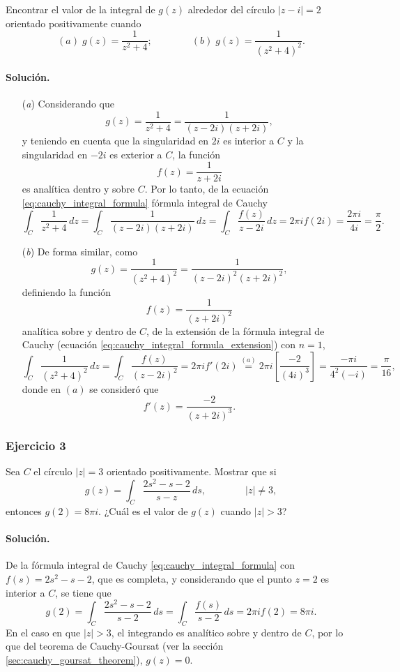 \documentclass[a4paper]{report}
\begin{document}
Encontrar el valor de la integral de \(g(z)\) alrededor del círculo \(|z-i|=2\) orientado positivamente cuando 
\[
 (\textit{a})\;g(z)=\frac{1}{z^2+4};\qquad\qquad 
 (\textit{b})\;g(z)=\frac{1}{(z^2+4)^2}.
\]

\paragraph{Solución.}
\begin{enumerate}
 \item[(\textit{a})] Considerando que 
 \[
  g(z)=\frac{1}{z^2+4}=\frac{1}{(z-2i)(z+2i)},
 \]
 y teniendo en cuenta que la singularidad en \(2i\) es interior a \(C\) y la singularidad en \(-2i\) es exterior a \(C\), la función 
 \[
  f(z)=\frac{1}{z+2i}
 \]
 es analítica dentro y sobre \(C\). Por lo tanto, de la ecuación \ref{eq:cauchy_integral_formula} fórmula integral de Cauchy
 \[
  \int_C\frac{1}{z^2+4}\,dz=\int_C\frac{1}{(z-2i)(z+2i)}\,dz=\int_C\frac{f(z)}{z-2i}\,dz=2\pi if(2i)=\frac{2\pi i}{4i}=\frac{\pi}{2}.
 \]
 \item[(\textit{b})] De forma similar, como
 \[
  g(z)=\frac{1}{(z^2+4)^2}=\frac{1}{(z-2i)^2(z+2i)^2},  
 \]
 definiendo la función 
 \[
  f(z)=\frac{1}{(z+2i)^2}
 \]
 analítica sobre y dentro de \(C\), de la extensión de la fórmula integral de Cauchy (ecuación \ref{eq:cauchy_integral_formula_extension}) con \(n=1\),
 \[
  \int_C\frac{1}{(z^2+4)^2}\,dz=\int_C\frac{f(z)}{(z-2i)^2}=2\pi if'(2i)
  \overset{(a)}{=}2\pi i\left[\frac{-2}{(4i)^3}\right]=\frac{-\pi i}{4^2(-i)}=\frac{\pi}{16},
 \]
 donde en \((a)\) se consideró que 
 \[
  f'(z)=\frac{-2}{(z+2i)^3}.
 \]
\end{enumerate}

\subsubsection*{Ejercicio 3}

Sea \(C\) el círculo \(|z|=3\) orientado positivamente. Mostrar que si
\[
 g(z)=\int_C\frac{2s^2-s-2}{s-z}\,ds,
 \qquad\qquad
 |z|\neq3,
\]
entonces \(g(2)=8\pi i\). ¿Cuál es el valor de \(g(z)\) cuando \(|z|>3\)?

\paragraph{Solución.} De la fórmula integral de Cauchy \ref{eq:cauchy_integral_formula} con \(f(s)=2s^2-s-2\), que es completa, y considerando que el punto \(z=2\) es interior a \(C\), se tiene que 
\[
 g(2)=\int_C\frac{2s^2-s-2}{s-2}\,ds=\int_C\frac{f(s)}{s-2}\,ds=2\pi if(2)=8\pi i.
\]
En el caso en que \(|z|>3\), el integrando es analítico sobre y dentro de \(C\), por lo que del teorema de Cauchy-Goursat (ver la sección \ref{sec:cauchy_goursat_theorem}), \(g(z)=0\).
\end{document}
